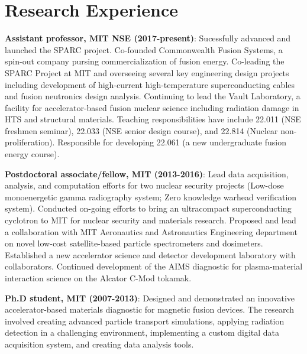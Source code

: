 \documentclass[10pt]{article}
\begin{document}
\section{Research Experience}
\begin{innerlist}
\item \textbf{Assistant professor, MIT NSE (2017-present)}:
  Sucessfully advanced and launched the SPARC project. Co-founded
  Commonwealth Fusion Systems, a spin-out company pursing
  commercialization of fusion energy. Co-leading the SPARC Project at
  MIT and overseeing several key engineering design projects including
  development of high-current high-temperature superconducting cables
  and fusion neutronics design analysis. Continuing to lead the Vault
  Laboratory, a facility for accelerator-based fusion nuclear science
  including radiation damage in HTS and structural materials. Teaching
  responsibilities have include 22.011 (NSE freshmen seminar), 22.033
  (NSE senior design course), and 22.814 (Nuclear
  non-proliferation). Responsible for developing 22.061 (a new
  undergraduate fusion energy course).\vspace{0.2cm}
  
\item \textbf{Postdoctoral associate/fellow, MIT (2013-2016)}:
  Lead data acquisition, analysis, and computation efforts for two
  nuclear security projects (Low-dose monoenergetic gamma radiography
  system; Zero knowledge warhead verification system). Conducted
  on-going efforts to bring an ultracompact superconducting cyclotron
  to MIT for nuclear security and materials research. Proposed and
  lead a collaboration with MIT Aeronautics and Astronautics
  Engineering department on novel low-cost satellite-based particle
  spectrometers and dosimeters. Established a new accelerator science
  and detector development laboratory with collaborators.  Continued
  development of the AIMS diagnostic for plasma-material interaction
  science on the Alcator C-Mod tokamak.\vspace{0.2cm}

\item \textbf{Ph.D student, MIT (2007-2013)}: Designed and
  demonstrated an innovative accelerator-based materials diagnostic
  for magnetic fusion devices. The research involved creating advanced
  particle transport simulations, applying radiation detection in a
  challenging environment, implementing a custom digital data
  acquisition system, and creating data analysis tools.\vspace{0.2cm}


\end{innerlist}
\end{document}
